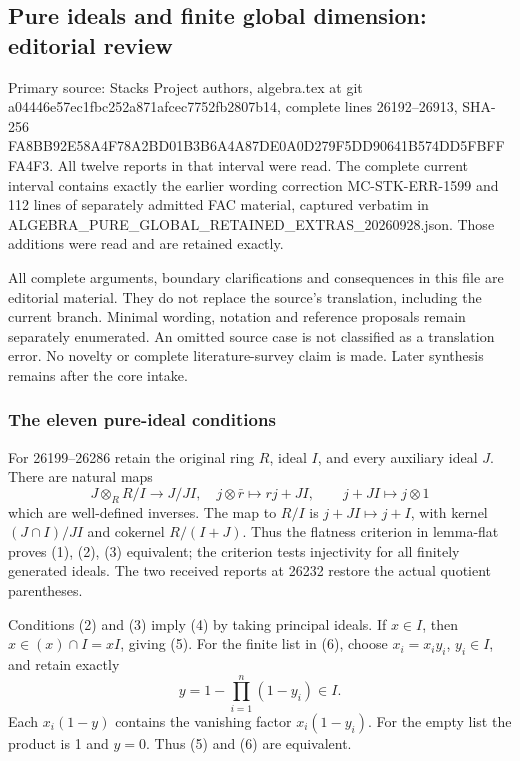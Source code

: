\subsection{Pure ideals and finite global dimension: editorial review}\label{pure-ideals-and-finite-global-dimension-editorial-review}

Primary source: Stacks Project authors, algebra.tex at git a04446e57ec1fbc252a871afcec7752fb2807b14, complete lines 26192--26913, SHA-256 FA8BB92E58A4F78A2BD01B3B6A4A87DE0A0D279F5DD90641B574DD5FBFFFA4F3. All twelve reports in that interval were read. The complete current interval contains exactly the earlier wording correction MC-STK-ERR-1599 and 112 lines of separately admitted FAC material, captured verbatim in ALGEBRA\_PURE\_GLOBAL\_RETAINED\_EXTRAS\_20260928.json. Those additions were read and are retained exactly.

All complete arguments, boundary clarifications and consequences in this file are editorial material. They do not replace the source's translation, including the current branch. Minimal wording, notation and reference proposals remain separately enumerated. An omitted source case is not classified as a translation error. No novelty or complete literature-survey claim is made. Later synthesis remains after the core intake.

\subsubsection{The eleven pure-ideal conditions}\label{the-eleven-pure-ideal-conditions}

For 26199--26286 retain the original ring \(R\), ideal \(I\), and every auxiliary ideal \(J\). There are natural maps \[
J\otimes_RR/I\longrightarrow J/JI,\quad j\otimes\bar r\mapsto rj+JI,
\qquad j+JI\longmapsto j\otimes1
\] which are well-defined inverses. The map to \(R/I\) is \(j+JI\mapsto j+I\), with kernel \((J\cap I)/JI\) and cokernel \(R/(I+J)\). Thus the flatness criterion in lemma-flat proves (1), (2), (3) equivalent; the criterion tests injectivity for all finitely generated ideals. The two received reports at 26232 restore the actual quotient parentheses.

Conditions (2) and (3) imply (4) by taking principal ideals. If \(x\in I\), then \(x\in(x)\cap I=xI\), giving (5). For the finite list in (6), choose \(x_i=x_i y_i\), \(y_i\in I\), and retain exactly \[
y=1-\prod_{i=1}^n(1-y_i)\in I .
\] Each \(x_i(1-y)\) contains the vanishing factor \(x_i(1-y_i)\). For the empty list the product is 1 and \(y=0\). Thus (5) and (6) are equivalent.

